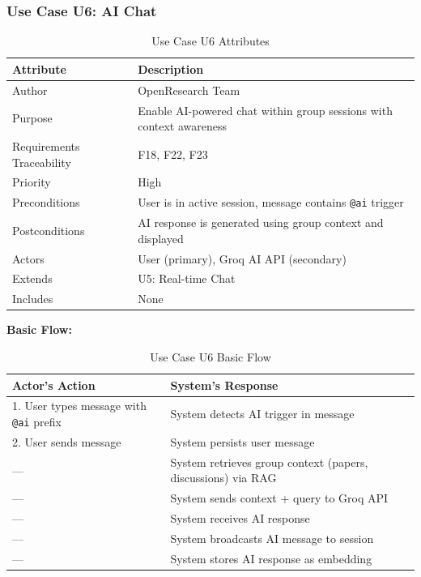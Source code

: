\documentclass[11pt,a4paper]{article}
\begin{document}
\subsubsection{Use Case U6: AI Chat}

\begin{table}[H]
\centering
\begin{tabular}{p{4cm}p{9cm}}
\toprule
\textbf{Attribute} & \textbf{Description} \\
\midrule
Author & OpenResearch Team \\
Purpose & Enable AI-powered chat within group sessions with context awareness \\
Requirements Traceability & F18, F22, F23 \\
Priority & High \\
Preconditions & User is in active session, message contains \texttt{@ai} trigger \\
Postconditions & AI response is generated using group context and displayed \\
Actors & User (primary), Groq AI API (secondary) \\
Extends & U5: Real-time Chat \\
Includes & None \\
\bottomrule
\end{tabular}
\caption{Use Case U6 Attributes}
\end{table}

\textbf{Basic Flow:}

\begin{table}[H]
\centering
\begin{tabular}{p{6cm}p{7cm}}
\toprule
\textbf{Actor's Action} & \textbf{System's Response} \\
\midrule
1. User types message with \texttt{@ai} prefix & System detects AI trigger in message \\
2. User sends message & System persists user message \\
--- & System retrieves group context (papers, discussions) via RAG \\
--- & System sends context + query to Groq API \\
--- & System receives AI response \\
--- & System broadcasts AI message to session \\
--- & System stores AI response as embedding \\
\bottomrule
\end{tabular}
\caption{Use Case U6 Basic Flow}
\end{table}
\end{document}
